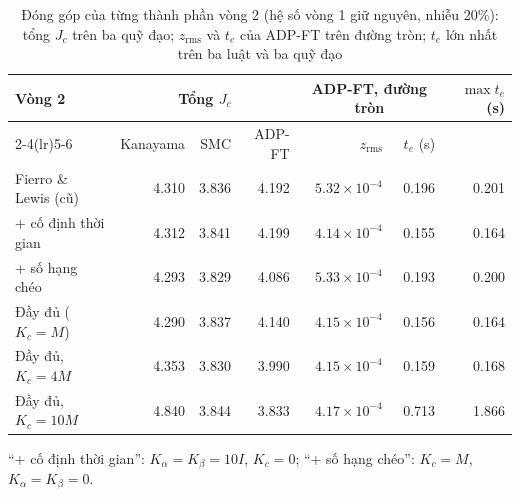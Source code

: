 \documentclass[12pt,a4paper]{article}
\begin{document}
\begin{table}[H]
\centering
\caption{Đóng góp của từng thành phần vòng 2 (hệ số vòng 1 giữ nguyên, nhiễu 20\%): tổng $J_c$ trên ba quỹ đạo; $z_\text{rms}$ và $t_e$ của ADP-FT trên đường tròn; $t_e$ lớn nhất trên ba luật và ba quỹ đạo}
\label{tab:step2}
\small
\setlength{\tabcolsep}{5pt}
\begin{tabular}{lrrrrrr}
\toprule
\multirow{2}{*}{\textbf{Vòng 2}} & \multicolumn{3}{c}{Tổng $J_c$} & \multicolumn{2}{c}{ADP-FT, đường tròn} & \multirow{2}{*}{$\max t_e$ (s)} \\
\cmidrule(lr){2-4}\cmidrule(lr){5-6}
 & Kanayama & SMC & ADP-FT & $z_\text{rms}$ & $t_e$ (s) & \\
\midrule
Fierro \& Lewis (cũ) & 4.310 & 3.836 & 4.192 & $5.32\times10^{-4}$ & 0.196 & 0.201 \\
+ cố định thời gian & 4.312 & 3.841 & 4.199 & $4.14\times10^{-4}$ & 0.155 & 0.164 \\
+ số hạng chéo & 4.293 & 3.829 & 4.086 & $5.33\times10^{-4}$ & 0.193 & 0.200 \\
Đầy đủ ($K_c = M$) & 4.290 & 3.837 & 4.140 & $4.15\times10^{-4}$ & 0.156 & 0.164 \\
Đầy đủ, $K_c = 4M$ & 4.353 & 3.830 & 3.990 & $4.15\times10^{-4}$ & 0.159 & 0.168 \\
Đầy đủ, $K_c = 10M$ & 4.840 & 3.844 & 3.833 & $4.17\times10^{-4}$ & 0.713 & 1.866 \\
\bottomrule
\end{tabular}

\vspace{0.15cm}
{\footnotesize ``+ cố định thời gian'': $K_\alpha = K_\beta = 10I$, $K_c = 0$; ``+ số hạng chéo'': $K_c = M$, $K_\alpha = K_\beta = 0$.}
\end{table}
\end{document}
